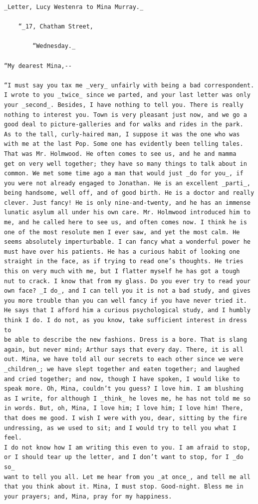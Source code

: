 \documentclass{article}
\begin{document}
\begin{verbatim}
_Letter, Lucy Westenra to Mina Murray._

    “_17, Chatham Street,

        “Wednesday._

“My dearest Mina,--

“I must say you tax me _very_ unfairly with being a bad correspondent.
I wrote to you _twice_ since we parted, and your last letter was only
your _second_. Besides, I have nothing to tell you. There is really
nothing to interest you. Town is very pleasant just now, and we go a
good deal to picture-galleries and for walks and rides in the park.
As to the tall, curly-haired man, I suppose it was the one who was
with me at the last Pop. Some one has evidently been telling tales.
That was Mr. Holmwood. He often comes to see us, and he and mamma
get on very well together; they have so many things to talk about in
common. We met some time ago a man that would just _do for you_, if
you were not already engaged to Jonathan. He is an excellent _parti_,
being handsome, well off, and of good birth. He is a doctor and really
clever. Just fancy! He is only nine-and-twenty, and he has an immense
lunatic asylum all under his own care. Mr. Holmwood introduced him to
me, and he called here to see us, and often comes now. I think he is
one of the most resolute men I ever saw, and yet the most calm. He
seems absolutely imperturbable. I can fancy what a wonderful power he
must have over his patients. He has a curious habit of looking one
straight in the face, as if trying to read one’s thoughts. He tries
this on very much with me, but I flatter myself he has got a tough
nut to crack. I know that from my glass. Do you ever try to read your
own face? _I do_, and I can tell you it is not a bad study, and gives
you more trouble than you can well fancy if you have never tried it.
He says that I afford him a curious psychological study, and I humbly
think I do. I do not, as you know, take sufficient interest in dress to
be able to describe the new fashions. Dress is a bore. That is slang
again, but never mind; Arthur says that every day. There, it is all
out. Mina, we have told all our secrets to each other since we were
_children_; we have slept together and eaten together; and laughed
and cried together; and now, though I have spoken, I would like to
speak more. Oh, Mina, couldn’t you guess? I love him. I am blushing
as I write, for although I _think_ he loves me, he has not told me so
in words. But, oh, Mina, I love him; I love him; I love him! There,
that does me good. I wish I were with you, dear, sitting by the fire
undressing, as we used to sit; and I would try to tell you what I feel.
I do not know how I am writing this even to you. I am afraid to stop,
or I should tear up the letter, and I don’t want to stop, for I _do so_
want to tell you all. Let me hear from you _at once_, and tell me all
that you think about it. Mina, I must stop. Good-night. Bless me in
your prayers; and, Mina, pray for my happiness.


\end{verbatim}
\end{document}
